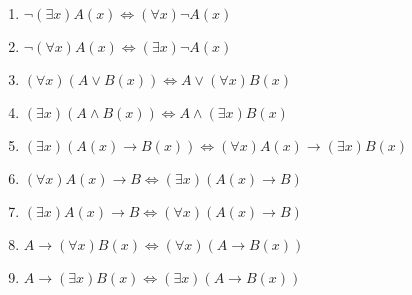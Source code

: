 \documentclass[10pt,a4paper,nofonts]{ctexart}
\begin{document}
\begin{multicols}{2}
\begin{enumerate}
\begin{enumerate}[label={$E_{\arabic*}$}]
\item $\neg(\exists x)A(x) \Leftrightarrow (\forall x)\neg A(x)$
\item $\neg(\forall x)A(x) \Leftrightarrow (\exists x)\neg A(x)$
\item $(\forall x)(A\vee B(x)) \Leftrightarrow A\vee(\forall x)B(x)$
\item $(\exists x)(A\wedge B(x)) \Leftrightarrow A\wedge(\exists x)B(x)$
\item $(\exists x)(A(x)\to B(x)) \Leftrightarrow (\forall x)A(x)\to(\exists x)B(x)$
\item $(\forall x)A(x)\to B \Leftrightarrow (\exists x)(A(x)\to B)$
\item $(\exists x)A(x)\to B \Leftrightarrow (\forall x)(A(x)\to B)$
\item $A\to(\forall x)B(x) \Leftrightarrow (\forall x)(A\to B(x))$
\item $A\to(\exists x)B(x) \Leftrightarrow (\exists x)(A\to B(x))$
\end{enumerate}

\end{enumerate}

\end{multicols}
\end{document}
